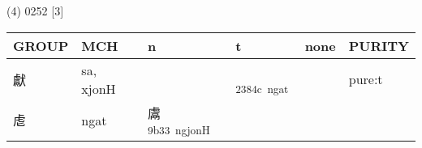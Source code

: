 \documentclass[14pt,a4paper]{scrartcl}
\begin{document}
(4) 0252 {[}3{]}

\begin{longtable}[c]{@{}llllll@{}}
\toprule
\begin{minipage}[b]{0.14\columnwidth}\raggedright\strut
GROUP
\strut\end{minipage} &
\begin{minipage}[b]{0.14\columnwidth}\raggedright\strut
MCH
\strut\end{minipage} &
\begin{minipage}[b]{0.14\columnwidth}\raggedright\strut
n
\strut\end{minipage} &
\begin{minipage}[b]{0.14\columnwidth}\raggedright\strut
t
\strut\end{minipage} &
\begin{minipage}[b]{0.14\columnwidth}\raggedright\strut
none
\strut\end{minipage} &
\begin{minipage}[b]{0.14\columnwidth}\raggedright\strut
PURITY
\strut\end{minipage}\tabularnewline
\midrule
\endhead
\begin{minipage}[t]{0.14\columnwidth}\raggedright\strut
獻
\strut\end{minipage} &
\begin{minipage}[t]{0.14\columnwidth}\raggedright\strut
sa, xjonH
\strut\end{minipage} &
\begin{minipage}[t]{0.14\columnwidth}\raggedright\strut
\strut\end{minipage} &
\begin{minipage}[t]{0.14\columnwidth}\raggedright\strut
𣡌\textsuperscript{2384c~ngat}
\strut\end{minipage} &
\begin{minipage}[t]{0.14\columnwidth}\raggedright\strut
\strut\end{minipage} &
\begin{minipage}[t]{0.14\columnwidth}\raggedright\strut
pure:t
\strut\end{minipage}\tabularnewline
\begin{minipage}[t]{0.14\columnwidth}\raggedright\strut
䖈
\strut\end{minipage} &
\begin{minipage}[t]{0.14\columnwidth}\raggedright\strut
ngat
\strut\end{minipage} &
\begin{minipage}[t]{0.14\columnwidth}\raggedright\strut
鬳\textsuperscript{9b33~ngjonH}

\end{minipage}
\end{longtable}
\end{document}
